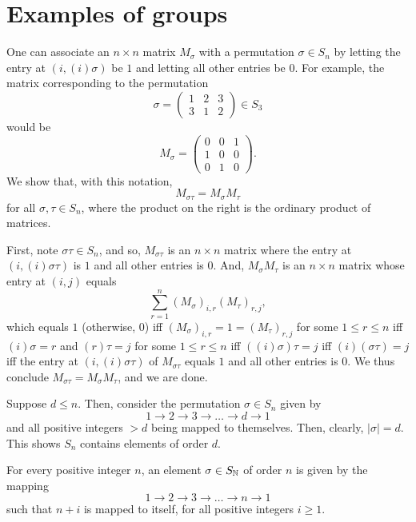 \section{Examples of groups}
\begin{xca}
One can associate an $n \times n$ matrix $M_{\sigma}$ with a permutation
$\sigma \in S_n$ by letting the entry at $(i, (i)\sigma)$ be $1$ and letting
all other entries be 0. For example, the matrix corresponding to the
permutation
\[
\sigma =
    \begin{pmatrix}
        1 & 2 & 3 \\
        3 & 1 & 2
    \end{pmatrix}
        \in S_3
\]
would be
\[
M_{\sigma} =
    \begin{pmatrix}
        0 & 0 & 1 \\
        1 & 0 & 0 \\
        0 & 1 & 0
    \end{pmatrix}.
\]
We show that, with this notation, \[ M_{\sigma \tau} = M_{\sigma} M_{\tau} \]
for all $\sigma, \tau \in S_n$, where the product on the right is the ordinary
product of matrices.

First, note $\sigma \tau \in S_n$, and so, $M_{\sigma \tau}$ is an $n \times n$
matrix where the entry at $(i, (i)\sigma \tau)$ is $1$ and all other entries is
$0$. And, $M_{\sigma} M_{\tau}$ is an $n \times n$ matrix whose entry at
$(i, j)$ equals \[ \sum_{r=1}^{n} (M_{\sigma})_{i,r} (M_{\tau})_{r,j}, \] which
equals $1$ (otherwise, $0$) iff $(M_{\sigma})_{i,r} = 1 = (M_{\tau})_{r,j}$ for
some $1 \le r \le n$ iff $(i)\sigma = r$ and $(r)\tau = j$ for some $1 \le r \le
n$ iff $((i)\sigma) \tau = j$ iff $(i)(\sigma \tau) = j$ iff the entry at
$(i, (i)\sigma \tau)$ of $M_{\sigma \tau}$ equals $1$ and all other entries is
$0$. We thus conclude $M_{\sigma \tau} = M_{\sigma} M_{\tau}$, and we are done.
\end{xca}

\begin{xca}
Suppose $d \le n$. Then, consider the permutation $\sigma \in S_n$ given by
\[ 1 \to 2 \to 3 \to \ldots \to d \to 1 \] and all positive integers $> d$
being mapped to themselves. Then, clearly, $|\sigma| = d$. This shows $S_n$
contains elements of order $d$.
\end{xca}

\begin{xca}
For every positive integer $n$, an element $\sigma \in S_{\mathbb{N}}$ of order $n$ is
given by the mapping \[ 1 \to 2 \to 3 \to \ldots \to n \to 1 \] such that
$n+i$ is mapped to itself, for all positive integers $i \ge 1$.
\end{xca}

